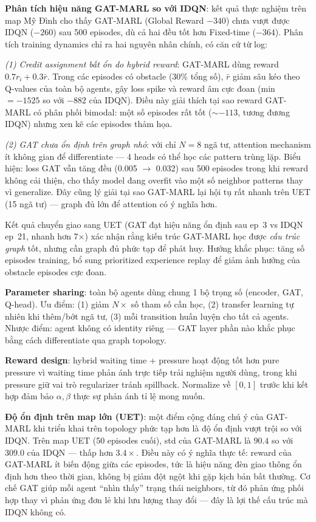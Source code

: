 \documentclass[conference]{IEEEtran}
\begin{document}
\textbf{Phân tích hiệu năng GAT-MARL so với IDQN}: kết quả thực nghiệm trên map Mỹ Đình cho thấy GAT-MARL (Global Reward $-340$) chưa vượt được IDQN ($-260$) sau 500 episodes, dù cả hai đều tốt hơn Fixed-time ($-364$). Phân tích training dynamics chỉ ra hai nguyên nhân chính, có căn cứ từ log:

\textit{(1) Credit assignment bất ổn do hybrid reward}: GAT-MARL dùng reward $0.7 r_i + 0.3\bar{r}$. Trong các episodes có obstacle (30\% tổng số), $\bar{r}$ giảm sâu kéo theo Q-values của toàn bộ agents, gây loss spike và reward âm cực đoan (min $= -1525$ so với $-882$ của IDQN). Điều này giải thích tại sao reward GAT-MARL có phân phối bimodal: một số episodes rất tốt ($\sim -113$, tương đương IDQN) nhưng xen kẽ các episodes thảm họa.

\textit{(2) GAT chưa ổn định trên graph nhỏ}: với chỉ $N=8$ ngã tư, attention mechanism ít không gian để differentiate --- 4 heads có thể học các pattern trùng lặp. Biểu hiện: loss GAT vẫn tăng đều (0.005 $\to$ 0.032) sau 500 episodes trong khi reward không cải thiện, cho thấy model đang overfit vào một số neighbor patterns thay vì generalize. Đây cũng lý giải tại sao GAT-MARL lại hội tụ rất nhanh trên UET (15 ngã tư) --- graph đủ lớn để attention có ý nghĩa hơn.

Kết quả chuyển giao sang UET (GAT đạt hiệu năng ổn định sau ep~3 vs IDQN ep~21, nhanh hơn 7×) xác nhận rằng kiến trúc GAT-MARL học được \textit{cấu trúc graph} tốt, nhưng cần graph đủ phức tạp để phát huy. Hướng khắc phục: tăng số episodes training, bổ sung prioritized experience replay để giảm ảnh hưởng của obstacle episodes cực đoan.

\textbf{Parameter sharing}: toàn bộ agents dùng chung 1 bộ trọng số (encoder, GAT, Q-head). Ưu điểm: (1) giảm $N\times$ số tham số cần học, (2) transfer learning tự nhiên khi thêm/bớt ngã tư, (3) mỗi transition huấn luyện cho tất cả agents. Nhược điểm: agent không có identity riêng --- GAT layer phần nào khắc phục bằng cách differentiate qua graph topology.

\textbf{Reward design}: hybrid waiting time + pressure hoạt động tốt hơn pure pressure vì waiting time phản ánh trực tiếp trải nghiệm người dùng, trong khi pressure giữ vai trò regularizer tránh spillback. Normalize về $[0, 1]$ trước khi kết hợp đảm bảo $\alpha, \beta$ thực sự phản ánh tỉ lệ mong muốn.

\textbf{Độ ổn định trên map lớn (UET)}: một điểm cộng đáng chú ý của GAT-MARL khi triển khai trên topology phức tạp hơn là độ ổn định vượt trội so với IDQN. Trên map UET (50 episodes cuối), std của GAT-MARL là $90.4$ so với $309.0$ của IDQN --- thấp hơn $3.4\times$. Điều này có ý nghĩa thực tế: reward của GAT-MARL ít biến động giữa các episodes, tức là hiệu năng đèn giao thông ổn định hơn theo thời gian, không bị giảm đột ngột khi gặp kịch bản bất thường. Cơ chế GAT giúp mỗi agent ``nhìn thấy'' trạng thái neighbors, từ đó phản ứng phối hợp thay vì phản ứng đơn lẻ khi lưu lượng thay đổi --- đây là lợi thế cấu trúc mà IDQN không có.
\end{document}
